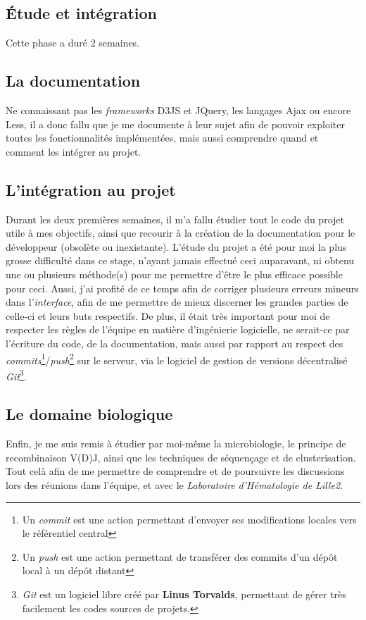 \documentclass[pdftex,12pt,a4paper]{report}
\begin{document}
\begin{spacing}{1.2}
\section{Étude et intégration}

Cette phase a duré 2 semaines.

\subsection{La documentation}
Ne connaissant pas les \textit{frameworks} D3JS et JQuery, les langages Ajax ou encore Less, il a donc fallu que je me documente à leur sujet afin de pouvoir exploiter toutes les fonctionnalités implémentées, mais aussi comprendre quand et comment les intégrer au projet.

\subsection{L'intégration au projet}
Durant les deux premières semaines, il m'a fallu étudier tout le code du projet utile à mes objectifs, ainsi que recourir à la création de la documentation pour le développeur (obsolète ou inexistante). L'étude du projet a été pour moi la plus grosse difficulté dans ce stage, n'ayant jamais effectué ceci auparavant, ni obtenu une ou plusieurs méthode(s) pour me permettre d'être le plus efficace possible pour ceci. Aussi, j'ai profité de ce temps afin de corriger plusieurs erreurs mineurs dans l'\textit{interface}, afin de me permettre de mieux discerner les grandes parties de celle-ci et leurs buts respectifs.
\newline
De plus, il était très important pour moi de respecter les règles de l'équipe en matière d'ingénierie logicielle, ne serait-ce par l'écriture du code, de la documentation, mais aussi par rapport au respect des \textit{commits}\footnote{Un \textit{commit} est une action permettant d'envoyer ses modifications locales vers le référentiel central}/\textit{push}\footnote{Un \textit{push} est une action permettant de transférer des commits d'un dépôt local à un dépôt distant} sur le serveur, via le logiciel de gestion de versions décentralisé \textit{Git}\footnote{\textit{Git} est un logiciel libre créé par \textbf{Linus Torvalds}, permettant de gérer très facilement les codes sources de projets.}.

\subsection{Le domaine biologique}
Enfin, je me suis remis à étudier par moi-même la microbiologie, le principe de recombinaison V(D)J, ainsi que les techniques de séquençage et de clusterisation. Tout celà afin de me permettre de comprendre et de poursuivre les discussions lors des réunions dans l'équipe, et avec le \textit{Laboratoire d'Hématologie de Lille2}.


\end{spacing}
\end{document}
